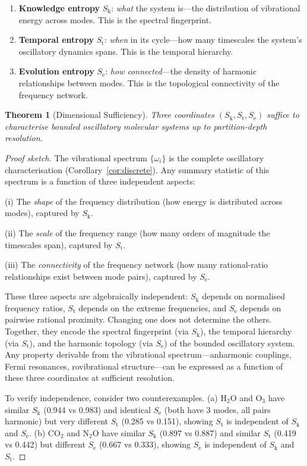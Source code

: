 \documentclass[11pt,twocolumn,a4paper]{article}
\newtheorem{theorem}{Theorem}[section]
\theoremstyle{definition}
\theoremstyle{remark}
\newcommand{\Sk}{S_{\mathrm{k}}}
\newcommand{\St}{S_{\mathrm{t}}}
\newcommand{\Se}{S_{\mathrm{e}}}
\begin{document}
\begin{enumerate}
\item \textbf{Knowledge entropy} $\Sk$: \emph{what} the system is---the distribution of vibrational energy across modes. This is the spectral fingerprint.
\item \textbf{Temporal entropy} $\St$: \emph{when} in its cycle---how many timescales the system's oscillatory dynamics spans. This is the temporal hierarchy.
\item \textbf{Evolution entropy} $\Se$: \emph{how connected}---the density of harmonic relationships between modes. This is the topological connectivity of the frequency network.
\end{enumerate}

\begin{theorem}[Dimensional Sufficiency]
\label{thm:dimensional}
Three coordinates $(\Sk, \St, \Se)$ suffice to characterise bounded oscillatory molecular systems up to partition-depth resolution.
\end{theorem}

\begin{proof}[Proof sketch]
The vibrational spectrum $\{\omega_i\}$ is the complete oscillatory characterisation (Corollary~\ref{cor:discrete}). Any summary statistic of this spectrum is a function of three independent aspects:

(i) The \emph{shape} of the frequency distribution (how energy is distributed across modes), captured by $\Sk$.

(ii) The \emph{scale} of the frequency range (how many orders of magnitude the timescales span), captured by $\St$.

(iii) The \emph{connectivity} of the frequency network (how many rational-ratio relationships exist between mode pairs), captured by $\Se$.

These three aspects are algebraically independent: $\Sk$ depends on normalised frequency ratios, $\St$ depends on the extreme frequencies, and $\Se$ depends on pairwise rational proximity. Changing one does not determine the others. Together, they encode the spectral fingerprint (via $\Sk$), the temporal hierarchy (via $\St$), and the harmonic topology (via $\Se$) of the bounded oscillatory system. Any property derivable from the vibrational spectrum---anharmonic couplings, Fermi resonances, rovibrational structure---can be expressed as a function of these three coordinates at sufficient resolution.

To verify independence, consider two counterexamples. (a) H$_2$O and O$_3$ have similar $\Sk$ (0.944 vs 0.983) and identical $\Se$ (both have 3 modes, all pairs harmonic) but very different $\St$ (0.285 vs 0.151), showing $\St$ is independent of $\Sk$ and $\Se$. (b) CO$_2$ and N$_2$O have similar $\Sk$ (0.897 vs 0.887) and similar $\St$ (0.419 vs 0.442) but different $\Se$ (0.667 vs 0.333), showing $\Se$ is independent of $\Sk$ and $\St$.
\end{proof}
\end{document}
